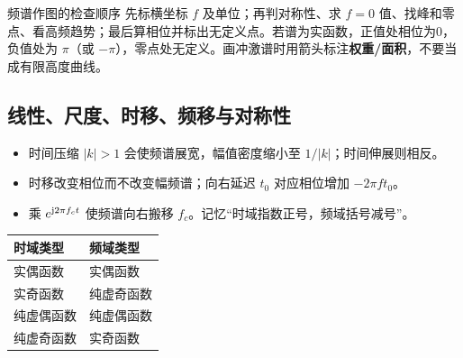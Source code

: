 \begin{focusbox}{频谱作图的检查顺序}
先标横坐标 $f$ 及单位；再判对称性、求 $f=0$ 值、找峰和零点、看高频趋势；最后算相位并标出无定义点。若谱为实函数，正值处相位为0，负值处为 $\pi$（或 $-\pi$），零点处无定义。画冲激谱时用箭头标注\textbf{权重/面积}，不要当成有限高度曲线。
\end{focusbox}

\Needspace{7cm}
\subsection{线性、尺度、时移、频移与对称性}


\begin{itemize}
\item 时间压缩 $|k|>1$ 会使频谱展宽，幅值密度缩小至 $1/|k|$；时间伸展则相反。
\item 时移改变相位而不改变幅频谱；向右延迟 $t_0$ 对应相位增加 $-2\pi ft_0$。
\item 乘 $e^{\mathrm{j}2\pi f_ct}$ 使频谱向右搬移 $f_c$。记忆“时域指数正号，频域括号减号”。
\end{itemize}

\begin{table}[H]
\centering
\begin{tabular}{@{}ll@{}}
\toprule
时域类型 & 频域类型 \\
\midrule
实偶函数 & 实偶函数 \\
实奇函数 & 纯虚奇函数 \\
纯虚偶函数 & 纯虚偶函数 \\
纯虚奇函数 & 实奇函数 \\
\bottomrule
\end{tabular}
\end{table}


